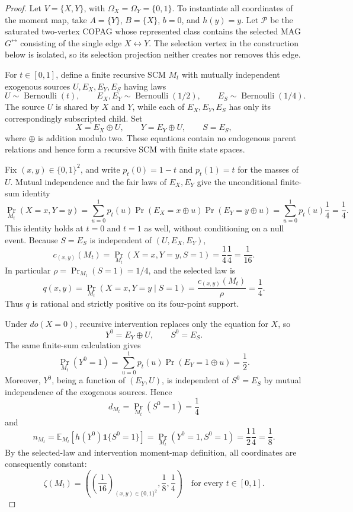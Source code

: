\documentclass{article}
\begin{document}
\begin{proof}
Let \(V=\{X,Y\}\), with \(\Omega_X=\Omega_Y=\{0,1\}\).  To instantiate all coordinates of the moment map, take \(A=\{Y\}\), \(B=\{X\}\), \(b=0\), and \(h(y)=y\).  Let \(\mathcal P\) be the saturated two-vertex COPAG whose represented class contains the selected MAG \(G^{\leftrightarrow}\) consisting of the single edge \(X\leftrightarrow Y\).  The selection vertex in the construction below is isolated, so its selection projection neither creates nor removes this edge.

For \(t\in[0,1]\), define a finite recursive SCM \(M_t\) with mutually independent exogenous sources \(U,E_X,E_Y,E_S\) having laws
\[
 U\sim\operatorname{Bernoulli}(t),\qquad
 E_X,E_Y\sim\operatorname{Bernoulli}(1/2),\qquad
 E_S\sim\operatorname{Bernoulli}(1/4).
\]
The source \(U\) is shared by \(X\) and \(Y\), while each of \(E_X,E_Y,E_S\) has only its correspondingly subscripted child.  Set
\[
 X=E_X\oplus U,\qquad Y=E_Y\oplus U,\qquad S=E_S,
\]
where \(\oplus\) is addition modulo two.  These equations contain no endogenous parent relations and hence form a recursive SCM with finite state spaces.

Fix \((x,y)\in\{0,1\}^2\), and write \(p_t(0)=1-t\) and \(p_t(1)=t\) for the masses of \(U\).  Mutual independence and the fair laws of \(E_X,E_Y\) give the unconditional finite-sum identity
\[
 \Pr_{M_t}(X=x,Y=y)
 =\sum_{u=0}^1 p_t(u)\Pr(E_X=x\oplus u)\Pr(E_Y=y\oplus u)
 =\sum_{u=0}^1p_t(u)\frac14=\frac14.
\]
This identity holds at \(t=0\) and \(t=1\) as well, without conditioning on a null event.  Because \(S=E_S\) is independent of \((U,E_X,E_Y)\),
\[
 c_{(x,y)}(M_t)
 =\Pr_{M_t}(X=x,Y=y,S=1)
 =\frac14\frac14=\frac1{16}.
\]
In particular \(\rho=\Pr_{M_t}(S=1)=1/4\), and the selected law is
\[
 q(x,y)=\Pr_{M_t}(X=x,Y=y\mid S=1)
 =\frac{c_{(x,y)}(M_t)}{\rho}=\frac14.
\]
Thus \(q\) is rational and strictly positive on its four-point support.

Under \(do(X=0)\), recursive intervention replaces only the equation for \(X\), so
\[
 Y^0=E_Y\oplus U,\qquad S^0=E_S.
\]
The same finite-sum calculation gives
\[
 \Pr_{M_t}(Y^0=1)=\sum_{u=0}^1p_t(u)\Pr(E_Y=1\oplus u)=\frac12.
\]
Moreover, \(Y^0\), being a function of \((E_Y,U)\), is independent of \(S^0=E_S\) by mutual independence of the exogenous sources.  Hence
\[
 d_{M_t}=\Pr_{M_t}(S^0=1)=\frac14
\]
and
\[
 n_{M_t}
 =\mathbb E_{M_t}\!\left[h(Y^0)\mathbf 1\{S^0=1\}\right]
 =\Pr_{M_t}(Y^0=1,S^0=1)
 =\frac12\frac14=\frac18.
\]
By the selected-law and intervention moment-map definition, all coordinates are consequently constant:
\[
 \zeta(M_t)
 =\left(\left(\frac1{16}\right)_{(x,y)\in\{0,1\}^2},\frac18,\frac14\right)
 \quad\text{for every }t\in[0,1].
\]


\end{proof}
\end{document}

